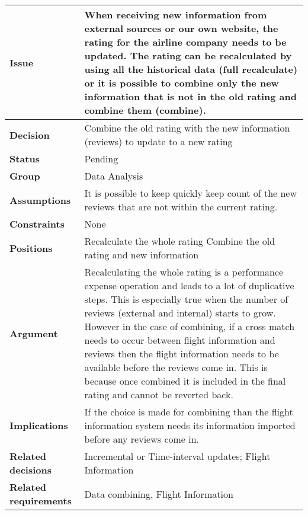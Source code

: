 
\label{dd:recalc-comb}
\begin{tabular}{ l  p{10cm}}
\hline
\bf Issue & When receiving new information from external sources or our own website, the rating for the airline company needs to be updated. The rating can be recalculated by using all the historical data (full recalculate) or it is possible to combine only the new information that is not in the old rating and combine them (combine). \\
\hline
\bf Decision & Combine the old rating with the new information (reviews) to update to a new rating\\
\hline
\bf Status & Pending\\
\hline
\bf Group & Data Analysis \\
\hline
\bf Assumptions & It is possible to keep quickly keep count of the new reviews that are not within the current rating. \\
\hline
\bf Constraints & None\\
\hline
\bf Positions & Recalculate the whole rating \newline\newline
Combine the old rating and new information
\\
\hline
\bf Argument & Recalculating the whole rating is a performance expense operation and leads to a lot of duplicative steps. This is especially true when the number of reviews (external and internal) starts to grow. However in the case of combining, if a cross match needs to occur between flight information and reviews then the flight information needs to be available before the reviews come in. This is because once combined it is included in the final rating and cannot be reverted back. \\
\hline
\bf Implications & If the choice is made for combining than the flight information system needs its information imported before any reviews come in. \\
\hline
\bf Related decisions & Incremental or Time-interval updates; Flight Information \\
\hline
\bf Related requirements  & Data combining, Flight Information\\
\hline
\end{tabular}
